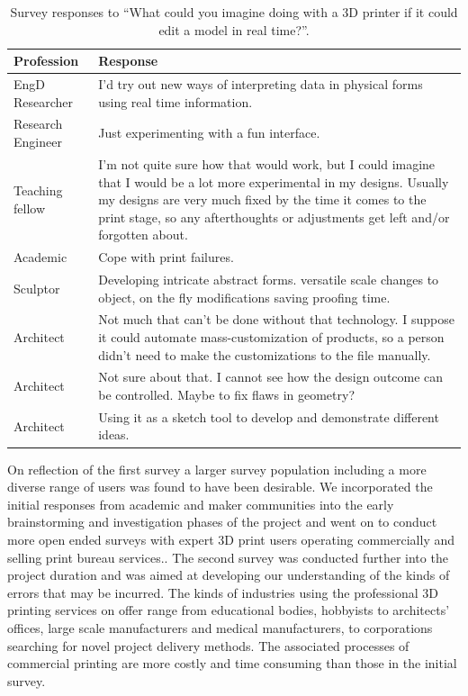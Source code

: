 \documentclass[pdftex, 11pt]{report} %
\begin{document}
\begin{table}[h]{\begin{minipage}{\textwidth}
\begin{tabular}{| p{2cm} | p{12cm} |}
\hline
\textbf{Profession} & \textbf{Response} \\\hline

EngD Researcher & I'd try out new ways of interpreting data in physical forms using real time information.\\\hline
Research Engineer & Just experimenting with a fun interface.\\\hline
Teaching fellow & I'm not quite sure how that would work, but I could imagine that I would be a lot more experimental in my designs. Usually my designs are very much fixed by the time it comes to the print stage, so any afterthoughts or adjustments get left and/or forgotten about.\\\hline
Academic & Cope with print failures.\\\hline
Sculptor & Developing intricate abstract forms. versatile scale changes to object, on the fly modifications saving proofing time.\\\hline
Architect & Not much that can't be done without that technology. I suppose it could automate mass-customization of products, so a person didn't need to make the customizations to the file manually.\\\hline
Architect & Not sure about that. I cannot see how the design outcome can be controlled. Maybe to fix flaws in geometry?\\\hline
Architect & Using it as a sketch tool to develop and demonstrate different ideas.\\\hline

\end{tabular}
\caption{Survey responses to ``What could you imagine doing with a 3D printer if it could edit a model in real time?''.}
\label{table:Surveys}
\end{minipage} }
\end{table}

On reflection of the first survey a larger survey population including a more diverse range of users was found to have been desirable. We incorporated the initial responses from academic and maker communities into the early brainstorming and investigation phases of the project and went on to conduct more open ended surveys with expert 3D print users operating commercially and selling print bureau services.. The second survey was conducted further into the project duration and was aimed at developing our understanding of the kinds of errors that may be incurred. The kinds of industries using the professional 3D printing services on offer range from educational bodies, hobbyists to architects' offices, large scale manufacturers and medical manufacturers, to corporations searching for novel project delivery methods. The associated processes of commercial printing are more costly and time consuming than those in the initial survey. 
\end{document}

